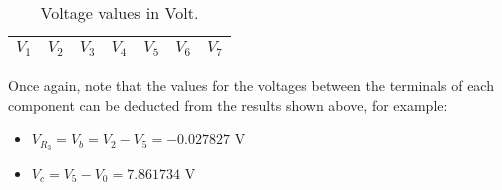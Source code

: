 \vspace{7mm}
\renewcommand{\arraystretch}{1.5}
\begin{table}[h]
  \centering
  \begin{tabular}{|c|c|c|c|c|c|c|}
    \hline    
    $V_1$ &  $V_2$ & $V_3$&  $V_4$& $V_5$ &$V_6$& $V_7$ \\ \hline
     \hline
  \end{tabular}
  \caption{Voltage values in Volt.}
  \label{tab_nodal}
\end{table}
\vspace{+5mm}

\vspace{3mm}
\par Once again, note that the values for the voltages between the terminals of each component can be deducted from the results shown above, for example:

\begin{itemize}
  \item $V_{R_3}=V_b=V_2-V_5=-0.027827$ V
\item $V_c=V_5-V_0=7.861734$ V
 
  \end{itemize}

